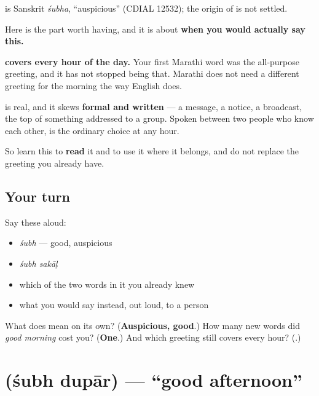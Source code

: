 \begin{cousinweb}
\textbf{} is Sanskrit \emph{śubha}, \textquotedblleft{}auspicious\textquotedblright{} (CDIAL 12532); the origin of \textbf{} is not settled.
\end{cousinweb}

\begin{culture}
Here is the part worth having, and it is about \textbf{when you would actually say this.}

\textbf{ covers every hour of the day.} Your first Marathi word was the all-purpose greeting, and it has not stopped being that. Marathi does not need a different greeting for the morning the way English does.

\textbf{ } is real, and it skews \textbf{formal and written} — a message, a notice, a broadcast, the top of something addressed to a group. Spoken between two people who know each other, \textbf{} is the ordinary choice at any hour.

So learn this to \textbf{read} it and to use it where it belongs, and do not replace the greeting you already have.
\end{culture}

\subsection*{Your turn}
Say these aloud:

\begin{itemize}
\raggedright
  \item \emph{śubh} — good, auspicious
  \item \emph{śubh sakāḷ}
  \item which of the two words in it you already knew
  \item what you would say instead, out loud, to a person
\end{itemize}

\begin{tcolorbox}[breakable,colback=teal!4,colframe=teal!35!black,title={Before you move on}]
What does \textbf{} mean on its own? (\textbf{Auspicious, good}.) How many new words did \emph{good morning} cost you? (\textbf{One}.) And which greeting still covers every hour? (\emph{\textbf{}}.)
\end{tcolorbox}
\section[\texorpdfstring{\mr{शुभ} \mr{दुपार} (śubh dupār)}{शुभ दुपार (śubh dupār)}]{  (śubh dupār) — \textquotedblleft{}good afternoon\textquotedblright{}}

